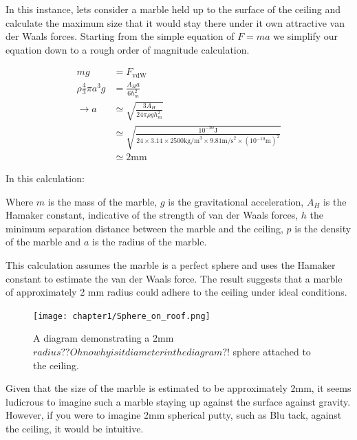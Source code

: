 In this instance, lets consider a marble held up to the surface of the ceiling and calculate the maximum size that it would stay there under it own attractive van der Waals forces. Starting from the simple equation of $F = ma$ we simplify our equation down to a rough order of magnitude calculation.


\begin{equation*}
\begin{split}
mg &= F_{\text{vdW}} \\
\rho \frac{4}{3} \pi a^3 g &= \frac{A_H a}{6 h_{m}^2} \\
\rightarrow a &\simeq \sqrt{\frac{3 A_H}{24 \pi \rho g h_{m}^2}} \\
&\simeq \sqrt{\frac{10^{-20} \text{J}}{24 \times 3.14 \times 2500 \text{kg/m}^3 \times 9.81 \text{m/s}^2 \times (10^{-10} \text{m})^2 }} \\
&\simeq 2 \text{mm}
\end{split}
\end{equation*}

In this calculation:

Where $m$ is the mass of the marble, $g$ is the gravitational acceleration, $A_H$ is the Hamaker constant, indicative of the strength of van der Waals forces, $h$ the minimum separation distance between the marble and the ceiling, $p$ is the density of the marble and $a$ is the radius of the marble.

This calculation assumes the marble is a perfect sphere and uses the Hamaker constant to estimate the van der Waals force. The result suggests that a marble of approximately 2 mm radius could adhere to the ceiling under ideal conditions.

\begin{figure}[h]     %
        \begin{center}
          \texttt{[image: chapter1/Sphere\_on\_roof.png]}
\end{center}
\caption{A diagram demonstrating a 2mm $radius?? Oh no why is it diameter in the diagram?!$ sphere attached to the ceiling.}
\label{fig:disp}                 %
\end{figure}

Given that the size of the marble is estimated to be approximately 2mm, it seems ludicrous to imagine such a marble staying up against the surface against gravity. However, if you were to imagine 2mm spherical putty, such as Blu tack, against the ceiling, it would be intuitive.

